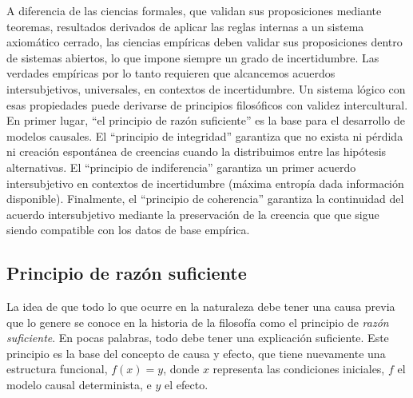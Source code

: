 \documentclass[a4paper,10pt]{book}
\theoremstyle{definition}
\begin{document}
A diferencia de las ciencias formales, que validan sus proposiciones mediante teoremas, resultados derivados de aplicar las reglas internas a un sistema axiomático cerrado, las ciencias emp\'iricas deben validar sus proposiciones dentro de sistemas abiertos, lo que impone siempre un grado de incertidumbre.
%
Las verdades emp\'iricas por lo tanto requieren que alcancemos acuerdos intersubjetivos, universales, en contextos de incertidumbre.
%
Un sistema l\'ogico con esas propiedades puede derivarse de principios filos\'oficos con validez intercultural.
%
En primer lugar, ``el principio de raz\'on suficiente'' es la base para el desarrollo de modelos causales.
%
El ``principio de integridad'' garantiza que no exista ni p\'erdida ni creaci\'on espontánea de creencias cuando la distribuimos entre las hip\'otesis alternativas.
%
El ``principio de indiferencia'' garantiza un primer acuerdo intersubjetivo en contextos de incertidumbre (máxima entrop\'ia dada informaci\'on disponible).
%
Finalmente, el ``principio de coherencia'' garantiza la continuidad del acuerdo intersubjetivo mediante la preservaci\'on de la creencia que que sigue siendo compatible con los datos de base emp\'irica.

\subsection{Principio de raz\'on suficiente}

La idea de que todo lo que ocurre en la naturaleza debe tener una causa previa que lo genere se conoce en la historia de la filosof\'ia como el principio de \emph{raz\'on suficiente}.
%
En pocas palabras, todo debe tener una explicaci\'on suficiente.
%
Este principio es la base del concepto de causa y efecto, que tiene nuevamente una estructura funcional, $f(x) = y$, donde $x$ representa las condiciones iniciales, $f$ el modelo causal determinista, e $y$ el efecto.

\end{document}
